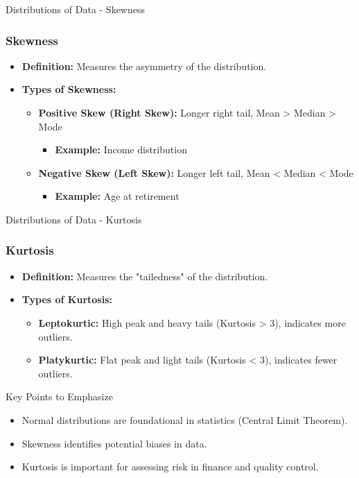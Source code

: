 \documentclass[aspectratio=169]{beamer}
\begin{document}
\begin{frame}[fragile]{Distributions of Data - Skewness}
    \frametitle{Skewness}
    \begin{itemize}
        \item \textbf{Definition:} Measures the asymmetry of the distribution.
        \item \textbf{Types of Skewness:}
        \begin{itemize}
            \item \textbf{Positive Skew (Right Skew):} Longer right tail, Mean > Median > Mode
            \begin{itemize}
                \item \textbf{Example:} Income distribution
            \end{itemize}
            \item \textbf{Negative Skew (Left Skew):} Longer left tail, Mean < Median < Mode
            \begin{itemize}
                \item \textbf{Example:} Age at retirement
            \end{itemize}
        \end{itemize}
    \end{itemize}
\end{frame}

\begin{frame}[fragile]{Distributions of Data - Kurtosis}
    \frametitle{Kurtosis}
    \begin{itemize}
        \item \textbf{Definition:} Measures the "tailedness" of the distribution.
        \item \textbf{Types of Kurtosis:}
        \begin{itemize}
            \item \textbf{Leptokurtic:} High peak and heavy tails (Kurtosis > 3), indicates more outliers.
            \item \textbf{Platykurtic:} Flat peak and light tails (Kurtosis < 3), indicates fewer outliers.
        \end{itemize}
    \end{itemize}
    
    \begin{block}{Key Points to Emphasize}
        \begin{itemize}
            \item Normal distributions are foundational in statistics (Central Limit Theorem).
            \item Skewness identifies potential biases in data.
            \item Kurtosis is important for assessing risk in finance and quality control.
        \end{itemize}
    \end{block}
\end{frame}
\end{document}
